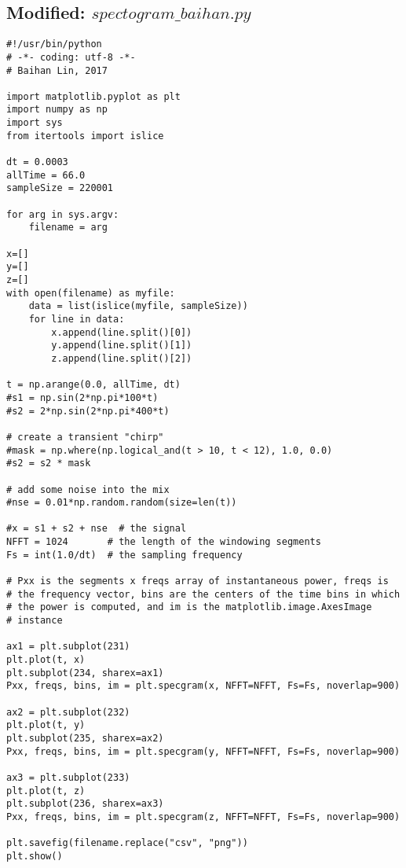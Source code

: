 \documentclass{sigchi}
\begin{document}
\subsection{Modified: $spectogram\_baihan.py$}\label{ss:specPy}
\begin{lstlisting}
#!/usr/bin/python
# -*- coding: utf-8 -*-
# Baihan Lin, 2017

import matplotlib.pyplot as plt
import numpy as np
import sys
from itertools import islice

dt = 0.0003
allTime = 66.0
sampleSize = 220001

for arg in sys.argv:
	filename = arg

x=[]
y=[]
z=[]
with open(filename) as myfile:
    data = list(islice(myfile, sampleSize))
    for line in data:
        x.append(line.split()[0])
        y.append(line.split()[1])
        z.append(line.split()[2])

t = np.arange(0.0, allTime, dt)
#s1 = np.sin(2*np.pi*100*t)
#s2 = 2*np.sin(2*np.pi*400*t)

# create a transient "chirp"
#mask = np.where(np.logical_and(t > 10, t < 12), 1.0, 0.0)
#s2 = s2 * mask

# add some noise into the mix
#nse = 0.01*np.random.random(size=len(t))

#x = s1 + s2 + nse  # the signal
NFFT = 1024       # the length of the windowing segments
Fs = int(1.0/dt)  # the sampling frequency

# Pxx is the segments x freqs array of instantaneous power, freqs is
# the frequency vector, bins are the centers of the time bins in which
# the power is computed, and im is the matplotlib.image.AxesImage
# instance

ax1 = plt.subplot(231)
plt.plot(t, x)
plt.subplot(234, sharex=ax1)
Pxx, freqs, bins, im = plt.specgram(x, NFFT=NFFT, Fs=Fs, noverlap=900)

ax2 = plt.subplot(232)
plt.plot(t, y)
plt.subplot(235, sharex=ax2)
Pxx, freqs, bins, im = plt.specgram(y, NFFT=NFFT, Fs=Fs, noverlap=900)

ax3 = plt.subplot(233)
plt.plot(t, z)
plt.subplot(236, sharex=ax3)
Pxx, freqs, bins, im = plt.specgram(z, NFFT=NFFT, Fs=Fs, noverlap=900)

plt.savefig(filename.replace("csv", "png"))
plt.show()
\end{lstlisting}
\end{document}
